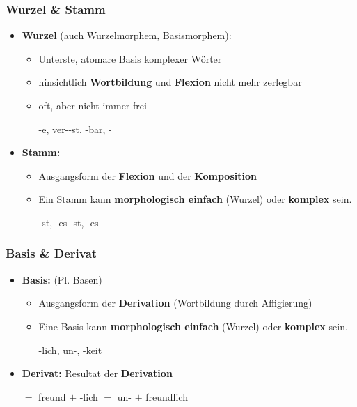 \begin{frame}
\frametitle{Wurzel \& Stamm}

\begin{itemize}
	\item \textbf{Wurzel} (auch Wurzelmorphem, Basismorphem): 
	
	\begin{itemize}
		\item Unterste, atomare Basis komplexer Wörter
		\item hinsichtlich \textbf{Wortbildung} und \textbf{Flexion} nicht mehr zerlegbar
		\item oft, aber nicht immer frei
		
		\ea {}-e, ver--st, -bar, -				
		\z 
	\end{itemize}


	\item \textbf{Stamm:}
	
	\begin{itemize}
		\item Ausgangsform der \textbf{Flexion} und der \textbf{Komposition}
		\item Ein Stamm kann \textbf{morphologisch einfach} (Wurzel) oder \textbf{komplex} sein.
	
		\ea 
			\ea {}-st, -es
			\ex {}-st, -es
			\z 
		\z 
	\end{itemize}
\end{itemize}

\end{frame}


\begin{frame}
\frametitle{Basis \& Derivat}

\begin{itemize}
	\item \textbf{Basis:} (Pl. Basen)
	
	\begin{itemize}
		\item Ausgangsform der \textbf{Derivation} (Wortbildung durch Affigierung)
		\item Eine Basis kann \textbf{morphologisch einfach} (Wurzel) oder \textbf{komplex} sein.
		
		\ea {}-lich, un-, -keit
		\z 

	\end{itemize}

	\item \textbf{Derivat:} Resultat der \textbf{Derivation}
	
	\ea 
		\ea {} $=$ freund $+$ -lich
		\ex {} $=$ un- $+$ freundlich
		\z 
	\z 

\end{itemize}

\end{frame}


